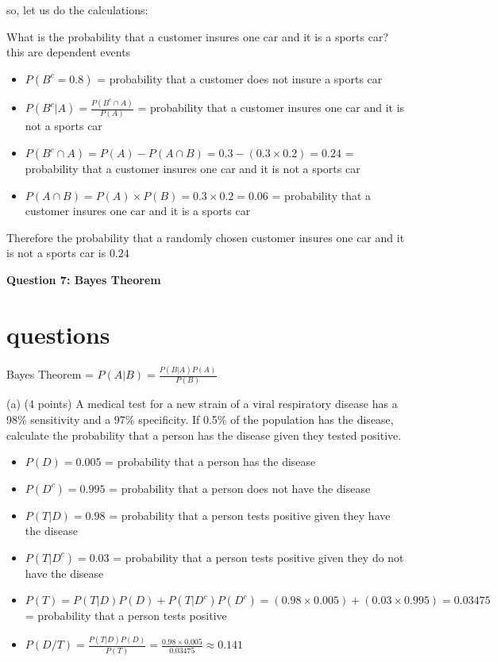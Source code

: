 \documentclass{article}
\begin{document}
so, let us do the calculations:


What is the probability that a customer insures one car and it is a sports car? this are dependent events
\begin{itemize}
   \item \(P(B^c = 0.8)\) = probability that a customer does not insure a sports car
   \item \(P(B^c|A) = \frac{P(B^c \cap A)}{P(A)}\) = probability that a customer insures one car and it is not a sports car
   \item \(P(B^c \cap A) = P(A) - P(A \cap B) = 0.3 - (0.3 \times 0.2) = 0.24\) = probability that a customer insures one car and it is not a sports car
   \item \(P(A \cap B) = P(A) \times P(B) = 0.3 \times 0.2 = 0.06\) = probability that a customer insures one car and it is a sports car
\end{itemize}

Therefore the probability that a randomly chosen customer insures one car and it is not a sports car is \(\mathbf{0.24}\)

\begin{center}
    \large \textbf{Question 7: Bayes Theorem}
\end{center}

\section{questions}

Bayes Theorem = \(P(A|B) = \frac{P(B|A)P(A)}{P(B)}\)

(a) (4 points) A medical test for a new strain of a viral respiratory disease has a 98\% sensitivity and
a 97\% specificity. If 0.5\% of the population has the disease, calculate the probability that a person
has the disease given they tested positive.

\begin{itemize}
    \item \(P(D) = 0.005\) = probability that a person has the disease
    \item \(P(D^c) = 0.995\) = probability that a person does not have the disease
    \item \(P(T|D) = 0.98\) = probability that a person tests positive given they have the disease
    \item \(P(T|D^c) = 0.03\) = probability that a person tests positive given they do not have the disease
    \item \(P(T) = P(T|D)P(D) + P(T|D^c)P(D^c) = (0.98 \times 0.005) + (0.03 \times 0.995) = 0.03475\) = probability that a person tests positive
    \item \(P(D/T) = \frac{P(T|D)P(D)}{P(T)} = \frac{0.98 \times 0.005}{0.03475} \approx 0.141\)
\end{itemize}
\end{document}
